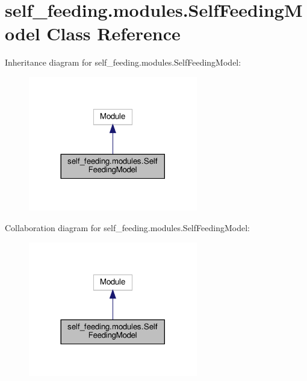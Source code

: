 \hypertarget{classself__feeding_1_1modules_1_1SelfFeedingModel}{}\section{self\+\_\+feeding.\+modules.\+Self\+Feeding\+Model Class Reference}
\label{classself__feeding_1_1modules_1_1SelfFeedingModel}


Inheritance diagram for self\+\_\+feeding.\+modules.\+Self\+Feeding\+Model\+:
\nopagebreak
\begin{figure}[H]
\begin{center}
\leavevmode
\includegraphics[width=209pt]{classself__feeding_1_1modules_1_1SelfFeedingModel__inherit__graph}
\end{center}
\end{figure}


Collaboration diagram for self\+\_\+feeding.\+modules.\+Self\+Feeding\+Model\+:
\nopagebreak
\begin{figure}[H]
\begin{center}
\leavevmode
\includegraphics[width=209pt]{classself__feeding_1_1modules_1_1SelfFeedingModel__coll__graph}
\end{center}
\end{figure}
